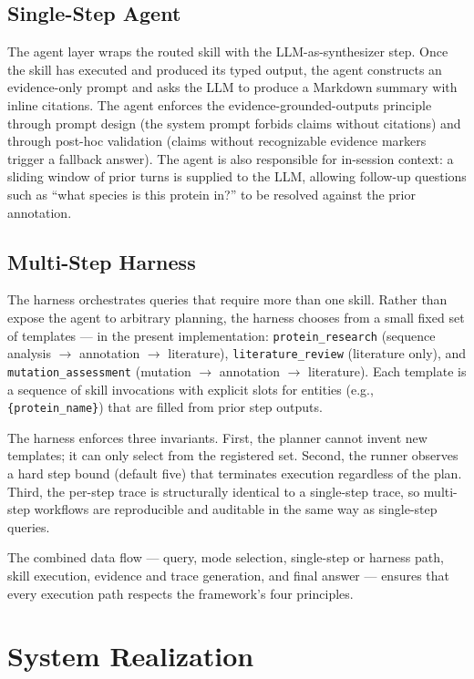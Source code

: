 \documentclass[11pt,letterpaper]{article}
\begin{document}
\subsection{Single-Step Agent}
\label{sec:agent}
The agent layer wraps the routed skill with the LLM-as-synthesizer step. Once the skill has executed and produced its typed output, the agent constructs an evidence-only prompt and asks the LLM to produce a Markdown summary with inline citations. The agent enforces the evidence-grounded-outputs principle through prompt design (the system prompt forbids claims without citations) and through post-hoc validation (claims without recognizable evidence markers trigger a fallback answer). The agent is also responsible for in-session context: a sliding window of prior turns is supplied to the LLM, allowing follow-up questions such as ``what species is this protein in?'' to be resolved against the prior annotation.

\subsection{Multi-Step Harness}
\label{sec:harness}
The harness orchestrates queries that require more than one skill. Rather than expose the agent to arbitrary planning, the harness chooses from a small fixed set of templates --- in the present implementation: \texttt{protein\_research} (sequence analysis $\to$ annotation $\to$ literature), \texttt{literature\_review} (literature only), and \texttt{mutation\_assessment} (mutation $\to$ annotation $\to$ literature). Each template is a sequence of skill invocations with explicit slots for entities (e.g., \texttt{\{protein\_name\}}) that are filled from prior step outputs.

The harness enforces three invariants. First, the planner cannot invent new templates; it can only select from the registered set. Second, the runner observes a hard step bound (default five) that terminates execution regardless of the plan. Third, the per-step trace is structurally identical to a single-step trace, so multi-step workflows are reproducible and auditable in the same way as single-step queries.

The combined data flow --- query, mode selection, single-step or harness path, skill execution, evidence and trace generation, and final answer --- ensures that every execution path respects the framework's four principles.

\section{System Realization}
\label{sec:system}
\end{document}
